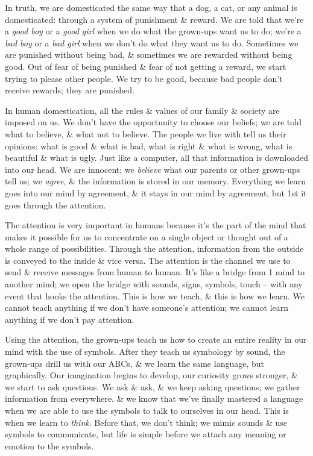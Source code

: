 \documentclass{article}
\numberwithin{equation}{section}
\begin{document}
In truth, we are domesticated the same way that a dog, a cat, or any animal is domesticated: through a system of punishment \& reward. We are told that we're a \textit{good boy} or a \textit{good girl} when we do what the grown-ups want us to do; we're a \textit{bad boy} or a \textit{bad girl} when we don't do what they want us to do. Sometimes we are punished without being bad, \& sometimes we are rewarded without being good. Out of fear of being punished \& fear of not getting a reward, we start trying to please other people. We try to be good, because bad people don't receive rewards; they are punished.

In human domestication, all the rules \& values of our family \& society are imposed on us. We don't have the opportunity to choose our beliefs; we are told what to believe, \& what not to believe. The people we live with tell us their opinions: what is good \& what is bad, what is right \& what is wrong, what is beautiful \& what is ugly. Just like a computer, all that information is downloaded into our head. We are innocent; we \textit{believe} what our parents or other grown-ups tell us; we \textit{agree}, \& the information is stored in our memory. Everything we learn goes into our mind by agreement, \& it stays in our mind by agreement, but 1st it goes through the attention.

The attention is very important in humans because it's the part of the mind that makes it possible for us to concentrate on a single object or thought out of a whole range of possibilities. Through the attention, information from the outside is conveyed to the inside \& vice versa. The attention is the channel we use to send \& receive messages from human to human. It's like a bridge from 1 mind to another mind; we open the bridge with sounds, signs, symbols, touch -- with any event that hooks the attention. This is how we teach, \& this is how we learn. We cannot teach anything if we don't have someone's attention; we cannot learn anything if we don't pay attention.

Using the attention, the grown-ups teach us how to create an entire reality in our mind with the use of symbols. After they teach us symbology by sound, the grown-ups drill us with our ABCs, \& we learn the same language, but graphically. Our imagination begins to develop, our curiosity grows stronger, \& we start to ask questions. We ask \& ask, \& we keep asking questions; we gather information from everywhere. \& we know that we've finally mastered a language when we are able to use the symbols to talk to ourselves in our head. This is when we learn to \textit{think}. Before that, we don't think; we mimic sounds \& use symbols to communicate, but life is simple before we attach any meaning or emotion to the symbols.
\end{document}
